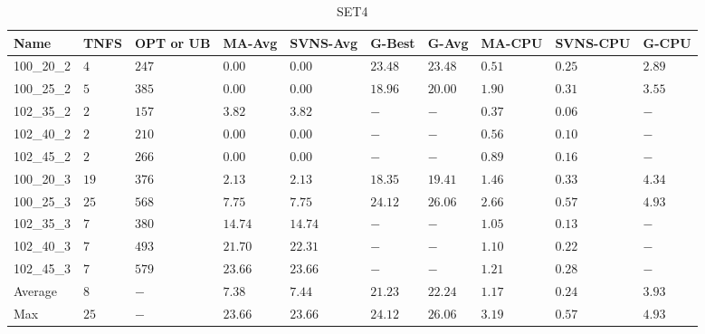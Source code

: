 \begin{center}
    \begin{table}[]
    \centering
    \begin{adjustwidth}{-0.4in}{-1in}
    \begin{tabular}{|lll|l|l|ll|lll|}
\hline
Name       & TNFS & OPT or UB & MA-Avg  & SVNS-Avg & G-Best & G-Avg & MA-CPU  & SVNS-CPU & G-CPU \\
\hline
100\_20\_2 & $4 $ & $247$     & $\bm{0.00} $ & $\bm{0.00} $   & $23.48$ & $23.48$ & $0.51$  & $0.25$   & $2.89$ \\
100\_25\_2 & $5 $ & $385$     & $\bm{0.00} $ & $\bm{0.00} $   & $18.96$ & $20.00$ & $1.90$  & $0.31$   & $3.55$ \\
\hline
102\_35\_2 & $2 $ & $157$     & $3.82 $ & $3.82 $   & $-    $ & $-    $ & $0.37$  & $0.06$   & $-   $ \\
102\_40\_2 & $2 $ & $210$     & $\bm{0.00} $ & $\bm{0.00} $   & $-    $ & $-    $ & $0.56$  & $0.10$   & $-   $ \\
102\_45\_2 & $2 $ & $266$     & $\bm{0.00} $ & $\bm{0.00} $   & $-    $ & $-    $ & $0.89$  & $0.16$   & $-   $ \\
\hline
100\_20\_3 & $19$ & $376$     & $2.13 $ & $2.13 $  & $18.35$ & $19.41$ & $1.46$  & $0.33$   & $4.34$ \\
100\_25\_3 & $25$ & $568$     & $7.75 $ & $7.75 $  & $24.12$ & $26.06$ & $2.66$  & $0.57$   & $4.93$ \\
\hline
102\_35\_3 & $7 $ & $380$     & $14.74$ & $14.74$  & $-    $ & $-    $ & $1.05$  & $0.13$   & $-   $ \\
102\_40\_3 & $7 $ & $493$     & $21.70$ & $22.31$  & $-    $ & $-    $ & $1.10$  & $0.22$   & $-   $ \\
102\_45\_3 & $7 $ & $579$     & $23.66$ & $23.66$  & $-    $ & $-    $ & $1.21$  & $0.28$   & $-   $ \\
\hline
Average    & $8 $ & $-  $     & $7.38$  & $7.44$   & $21.23$ & $22.24$ & $1.17$  & $0.24$   & $3.93$ \\
Max        & $25$ & $-  $     & $23.66$ & $23.66$  & $24.12$ & $26.06$ & $3.19$  & $0.57$   & $4.93$ \\
\hline
\end{tabular}
    \end{adjustwidth}
    \caption{SET4}
    \label{set4}
    \end{table}
\end{center}
